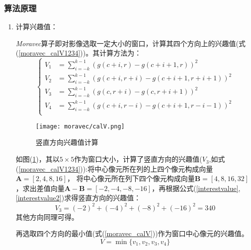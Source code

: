     \subsubsection{算法原理}
        \begin{enumerate}
            \item 计算兴趣值：
            
            \hspace{20pt} \textit{Moravec}算子即对影像选取一定大小的窗口，计算其四个方向上的兴趣值(式(\ref{moravec_calV1234}))。其计算方法为：
            \begin{equation}
                \label{moravec_calV1234}
                \left\{
                    \begin{aligned}
                        V_1 &= \sum_{i=-k}^{k-1} (g(c+i,r)-g(c+i+1,r))^2 \\
                        V_2 &= \sum_{i=-k}^{k-1} (g(c+i,r+i)-g(c+i+1,r+i+1))^2 \\
                        V_3 &= \sum_{i=-k}^{k-1} (g(c,r+i)-g(c,r+i+1))^2 \\
                        V_4 &= \sum_{i=-k}^{k-1} (g(c+i,r-i)-g(c+i+1,r-i-1))^2 \\
                    \end{aligned}
                \right.
            \end{equation}

            \begin{figure}[H]
                \centering 
                \texttt{[image: moravec/calV.png]}
                \caption{竖直方向兴趣值计算}
                \label{calV_vertical}
            \end{figure}

            如图(\ref{calV_vertical})，其以$5\times 5$作为窗口大小，计算了竖直方向的兴趣值($V_3$,如式(\ref{moravec_calV1234})):将中心像元所在列的上四个像元构成向量$\bm{A}=[2,4,8,16]$，
            将中心像元所在列下四个像元构成向量$\bm{B}=[4,8,16,32]$，求出差值向量$\bm{A}-\bm{B}=[-2,-4,-8,-16]$，再根据公式(\ref{interestvalue},\ref{interestvalue2})求得竖直方向的兴趣值：
            \begin{equation}
                V_3=(-2)^2+(-4)^2+(-8)^2+(-16)^2 = 340
            \end{equation}
            其他方向同理可得。

            再选取四个方向的最小值(式(\ref{moravec_calV}))作为窗口中心像元的兴趣值。
            \begin{equation}
                \label{moravec_calV}
                V= \min \{v_1,v_2,v_3,v_4\}
            \end{equation}


\end{enumerate}
